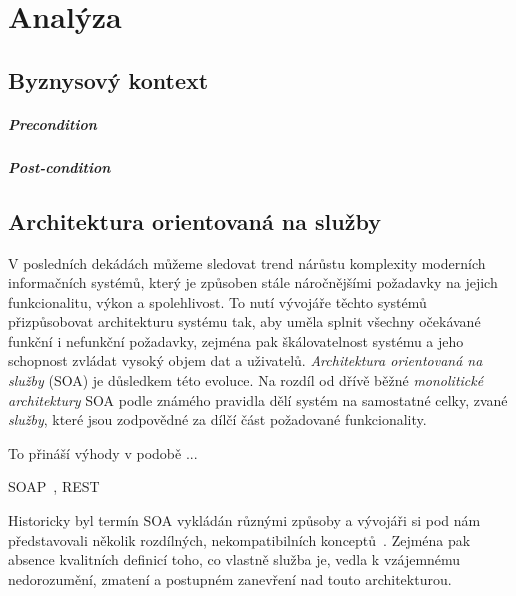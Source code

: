 \usepackage[T1]{fontenc}
\usepackage[utf8]{inputenc}
\usepackage{graphicx}


\chapter{Analýza}\label{ch:analyza}

\section{Byznysový kontext}

\paragraph{Precondition} %

\paragraph{Post-condition} %

\section{Architektura orientovaná na služby}

V posledních dekádách můžeme sledovat trend nárůstu komplexity
moderních informačních systémů, který je způsoben stále náročnějšími
požadavky na jejich funkcionalitu, výkon a spolehlivost. To nutí
vývojáře těchto systémů přizpůsobovat architekturu systému tak,
aby uměla splnit všechny očekávané funkční i nefunkční požadavky,
zejména pak škálovatelnost systému a jeho schopnost zvládat vysoký
objem dat a uživatelů. \textit{Architektura orientovaná na služby} (SOA) je
důsledkem této evoluce. Na rozdíl od dřívě běžné \textit{monolitické architektury}
SOA podle známého pravidla 
dělí systém na samostatné celky, zvané \textit{služby}, které jsou
zodpovědné za dílčí část požadované funkcionality.


To přináší výhody v podobě ... %

SOAP~\cite{curbera2002unraveling}, REST~\cite{fielding2000rest}


Historicky byl termín SOA vykládán různými způsoby a vývojáři si
pod nám představovali několik rozdílných, nekompatibilních
konceptů~\cite{fowler2005serviceorientedambiguity}.
Zejména pak absence kvalitních definicí toho, co vlastně
služba je, vedla k vzájemnému nedorozumění, zmatení a postupném
zanevření nad touto architekturou.

